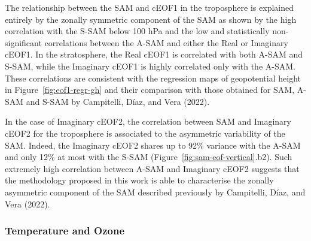 \documentclass[smallextended]{svjour3}       %
\begin{document}
The relationship between the SAM and cEOF1 in the troposphere is explained entirely by the zonally symmetric component of the SAM as shown by the high correlation with the S-SAM below 100 hPa and the low and statistically non-significant correlations between the A-SAM and either the Real or Imaginary cEOF1.
In the stratosphere, the Real cEOF1 is correlated with both A-SAM and S-SAM, while the Imaginary cEOF1 is highly correlated only with the A-SAM.
These correlations are consistent with the regression maps of geopotential height in Figure~\ref{fig:eof1-regr-gh} and their comparison with those obtained for SAM, A-SAM and S-SAM by Campitelli, Díaz, and Vera (2022).

In the case of Imaginary cEOF2, the correlation between SAM and Imaginary cEOF2 for the troposphere is associated to the asymmetric variability of the SAM.
Indeed, the Imaginary cEOF2 shares up to 92\% variance with the A-SAM and only 12\% at most with the S-SAM (Figure~\ref{fig:sam-eof-vertical}.b2).
Such extremely high correlation between A-SAM and Imaginary cEOF2 suggests that the methodology proposed in this work is able to characterise the zonally asymmetric component of the SAM described previously by Campitelli, Díaz, and Vera (2022).

\hypertarget{temperature-and-ozone}{%
\subsubsection{Temperature and Ozone}\label{temperature-and-ozone}}
\end{document}
